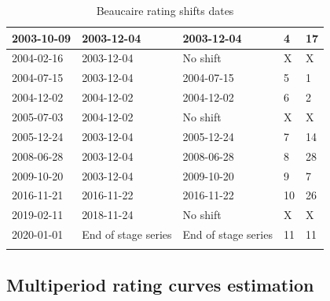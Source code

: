 \documentclass[11pt]{article}
\begin{document}
\begin{center}
\begin{table}[h!]
\begin{tabular}{|m{2.5cm}|m{3.5cm}|m{3.5cm}|m{1.5cm}|m{2.2cm}|}
                \hline
                2003-10-09     &       2003-12-04  &   2003-12-04   & 4 & 17 \\
                \hline
                2004-02-16     &       2003-12-04  &   No shift   & X & X \\
                \hline
                2004-07-15     &       2003-12-04  &   2004-07-15   & 5 & 1 \\
                \hline
                2004-12-02     &       2004-12-02  &   2004-12-02   & 6 & 2 \\
                \hline
                2005-07-03     &       2004-12-02  &   No shift  & X & X \\
                \hline
                2005-12-24     &       2003-12-04  &   2005-12-24  & 7 & 14 \\
                \hline
                2008-06-28     &       2003-12-04  &   2008-06-28    & 8 & 28 \\
                \hline
                2009-10-20     &       2003-12-04  &   2009-10-20   & 9 & 7 \\
                \hline
                2016-11-21     &       2016-11-22  &   2016-11-22  & 10 & 26 \\
                \hline
                2019-02-11     &       2018-11-24  &   No shift   & X & X \\
                \hline
                2020-01-01     &      End of stage series  &   End of stage series  & 11 & 11\\
                \lasthline
            \end{tabular}
            
            \caption{Beaucaire rating shifts dates}
            \label{tab:ShiftDates}
        \end{table}
    \end{center}
     \FloatBarrier
    
    \subsection{Multiperiod rating curves estimation}
\end{document}
